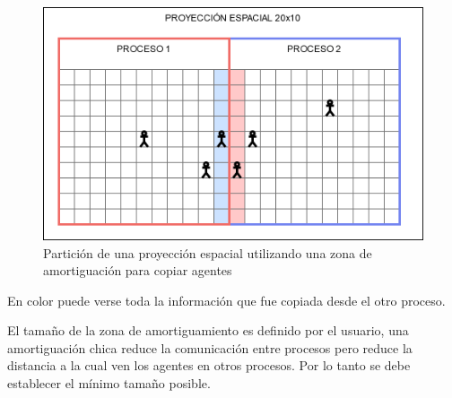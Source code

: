 \begin{figure}
	\centering
	\includegraphics{process_02.png}
	\caption{Partición de una proyección espacial utilizando una zona de amortiguación para copiar agentes}
\end{figure}

En color puede verse toda la información que fue copiada desde el otro
proceso.

El tamaño de la zona de amortiguamiento es definido por el usuario, una
amortiguación chica reduce la comunicación entre procesos pero reduce la
distancia a la cual ven los agentes en otros procesos. Por lo tanto se
debe establecer el mínimo tamaño posible.
